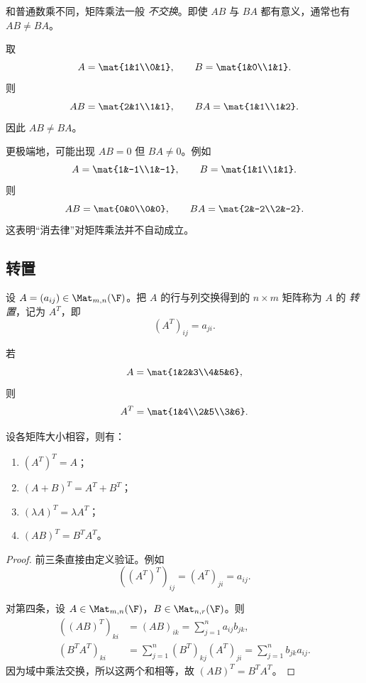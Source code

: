 \begin{remark}
和普通数乘不同，矩阵乘法一般 \emph{不交换}。即使 $AB$ 与 $BA$ 都有意义，通常也有 $AB\ne BA$。
\end{remark}

\begin{example}[矩阵乘法不交换]
取
\[
A=\mat{1&1\\0&1},\qquad B=\mat{1&0\\1&1}.
\]
则
\[
AB=\mat{2&1\\1&1},\qquad BA=\mat{1&1\\1&2}.
\]
因此 $AB\ne BA$。

更极端地，可能出现 $AB=0$ 但 $BA\ne 0$。例如
\[
A=\mat{1&-1\\1&-1},\qquad B=\mat{1&1\\1&1}.
\]
则
\[
AB=\mat{0&0\\0&0},\qquad BA=\mat{2&-2\\2&-2}.
\]
这表明“消去律”对矩阵乘法并不自动成立。
\end{example}

\subsection{转置}

\begin{definition}
设 $A=(a_{ij})\in\Mat_{m,n}(\F)$。把 $A$ 的行与列交换得到的 $n\times m$ 矩阵称为 $A$ 的 \emph{转置}，记为 $A^T$，即
\[
(A^T)_{ij}=a_{ji}.
\]
\end{definition}

\begin{example}
若
\[
A=\mat{1&2&3\\4&5&6},
\]
则
\[
A^T=\mat{1&4\\2&5\\3&6}.
\]
\end{example}

\begin{proposition}[转置的性质]
设各矩阵大小相容，则有：
\begin{enumerate}[label=(\arabic*)]
  \item $(A^T)^T=A$；
  \item $(A+B)^T=A^T+B^T$；
  \item $(\lambda A)^T=\lambda A^T$；
  \item $(AB)^T=B^TA^T$。
\end{enumerate}
\end{proposition}

\begin{proof}
前三条直接由定义验证。例如
\[
((A^T)^T)_{ij}=(A^T)_{ji}=a_{ij}.
\]

对第四条，设 $A\in\Mat_{m,n}(\F)$，$B\in\Mat_{n,r}(\F)$。则
\begin{align*}
((AB)^T)_{ki}&=(AB)_{ik}=\sum_{j=1}^n a_{ij}b_{jk},\\
(B^TA^T)_{ki}&=\sum_{j=1}^n (B^T)_{kj}(A^T)_{ji}=\sum_{j=1}^n b_{jk}a_{ij}.
\end{align*}
因为域中乘法交换，所以这两个和相等，故 $(AB)^T=B^TA^T$。
\end{proof}

